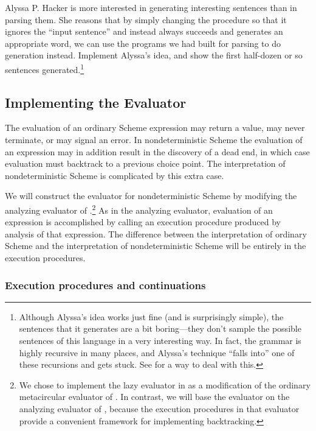 \begin{exerciseGroup}
\label{Exercise 4.49}
 Alyssa P. Hacker is more
interested in generating interesting sentences than in parsing them.  She
reasons that by simply changing the procedure  so that it
ignores the ``input sentence'' and instead always succeeds and generates an
appropriate word, we can use the programs we had built for parsing to do
generation instead.  Implement Alyssa's idea, and show the first half-dozen or
so sentences generated.\footnote{Although Alyssa's idea works just fine (and is
surprisingly simple), the sentences that it generates are a bit boring---they
don't sample the possible sentences of this language in a very interesting way.
In fact, the grammar is highly recursive in many places, and Alyssa's technique
``falls into'' one of these recursions and gets stuck.  See 
for a way to deal with this.}
\end{exerciseGroup}

\subsection{Implementing the  Evaluator}
\label{Section 4.3.3}

The evaluation of an ordinary Scheme expression may return a value, may never
terminate, or may signal an error.  In nondeterministic Scheme the evaluation
of an expression may in addition result in the discovery of a dead end, in
which case evaluation must backtrack to a previous choice point.  The
interpretation of nondeterministic Scheme is complicated by this extra case.

We will construct the  evaluator for nondeterministic Scheme by
modifying the analyzing evaluator of .\footnote{We chose to
implement the lazy evaluator in  as a modification of the
ordinary metacircular evaluator of .  In contrast, we will
base the  evaluator on the analyzing evaluator of
, because the execution procedures in that evaluator provide a
convenient framework for implementing backtracking.}  As in the analyzing
evaluator, evaluation of an expression is accomplished by calling an execution
procedure produced by analysis of that expression.  The difference between the
interpretation of ordinary Scheme and the interpretation of nondeterministic
Scheme will be entirely in the execution procedures.

\subsubsection*{Execution procedures and continuations}

